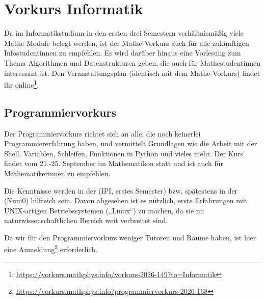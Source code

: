 \section{Vorkurs Informatik}
Da im Informatikstudium in den ersten drei Semestern verhältnismäßig viele Mathe-Module belegt werden, ist der Mathe-Vorkurs auch für alle zukünftigen Infostudentinnen zu empfehlen. Es wird darüber hinaus eine Vorlesung zum Thema Algorithmen und Datenstrukturen geben, die auch für Mathestudentinnen interessant ist. Den Veranstaltungsplan (identisch mit dem Mathe-Vorkurs) findet ihr online\footnote{\label{info-vorkursplan}\url{https://vorkurs.mathphys.info/vorkurs-2026-149?to=Informatik}}.

\subsection{Programmiervorkurs}
Der Programmiervorkurs richtet sich an alle, die noch keinerlei Programmiererfahrung haben, und vermittelt Grundlagen wie die Arbeit mit der Shell, Variablen, Schleifen, Funktionen in Python und vieles mehr. Der Kurs findet vom 21.-25. September im \gls{Mathematikon} statt und ist auch für Mathematikerinnen zu empfehlen.

Die Kenntnisse werden in der  (\gls{IPI}, erstes Semester) bzw. spätestens in der  (\gls{Num0}) hilfreich sein. Davon abgesehen ist es nützlich, erste Erfahrungen mit UNIX-artigen Betriebssystemen („Linux“) zu machen, da sie im naturwissenschaftlichen Bereich weit verbreitet sind.

Da wir für den Programmiervorkurs weniger Tutoren und Räume haben, ist hier eine Anmeldung\footnote{\label{programmier-vorkursplan}\url{https://vorkurs.mathphys.info/programmiervorkurs-2026-168}} erforderlich.
